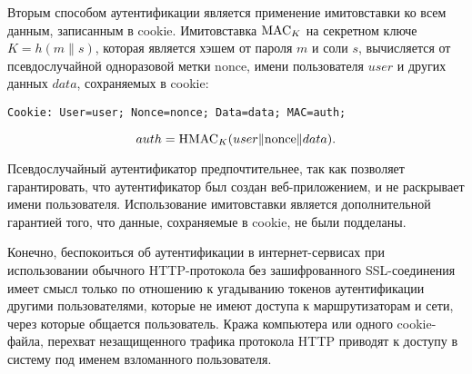 Вторым способом аутентификации является применение имитовставки ко всем данным, записанным в cookie. Имитовставка $\textrm{MAC}_K$ на секретном ключе $K = h(m \| s)$, которая является хэшем от пароля $m$ и соли $s$, вычисляется от псевдослучайной одноразовой метки $\textrm{nonce}$, имени пользователя $user$ и других данных $data$, сохраняемых в cookie:
\begin{center} \begin{verbatim}
Cookie: User=user; Nonce=nonce; Data=data; MAC=auth;
\end{verbatim} \end{center}
    \[ auth = \textrm{HMAC}_K(user \| \textrm{nonce} \| data). \]

Псевдослучайный аутентификатор предпочтительнее, так как позволяет гарантировать, что аутентификатор был создан веб-приложением, и не раскрывает имени пользователя. Использование имитовставки является дополнительной гарантией того, что данные, сохраняемые в cookie, не были подделаны.

Конечно, беспокоиться об аутентификации в интернет-сервисах при использовании обычного HTTP-протокола без зашифрованного SSL-соединения имеет смысл только по отношению к угадыванию токенов аутентификации другими пользователями, которые не имеют доступа к маршрутизаторам и сети, через которые общается пользователь. Кража компьютера или одного cookie-файла, перехват незащищенного трафика протокола HTTP приводят к доступу в систему под именем взломанного пользователя.
